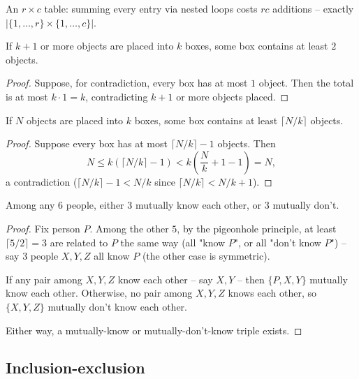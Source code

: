 \documentclass[11pt]{article}
\begin{document}
\begin{example}
An $r\times c$ table: summing every entry via nested loops costs $rc$ additions -- exactly $|\{1,\dots,r\}\times\{1,\dots,c\}|$.
\end{example}

\bigskip
\begin{definition}
If $k+1$ or more objects are placed into $k$ boxes, some box contains at least $2$ objects.
\end{definition}
\begin{proof}
Suppose, for contradiction, every box has at most $1$ object. Then the total is at most $k\cdot1=k$, contradicting $k+1$ or more objects placed.
\end{proof}

\bigskip
\begin{theorem}
If $N$ objects are placed into $k$ boxes, some box contains at least $\lceil N/k \rceil$ objects.
\end{theorem}
\begin{proof}
Suppose every box has at most $\lceil N/k\rceil - 1$ objects. Then
\[
N \le k\left(\lceil N/k\rceil - 1\right) < k\left(\frac{N}{k}+1-1\right) = N,
\]
a contradiction ($\lceil N/k\rceil - 1 < N/k$ since $\lceil N/k\rceil < N/k+1$).
\end{proof}

\bigskip
\begin{example}
Among any $6$ people, either $3$ mutually know each other, or $3$ mutually don't.
\end{example}
\begin{proof}
Fix person $P$. Among the other $5$, by the pigeonhole principle, at least $\lceil 5/2\rceil=3$ are related to $P$ the same way (all "know $P$", or all "don't know $P$") -- say $3$ people $X,Y,Z$ all know $P$ (the other case is symmetric).

If any pair among $X,Y,Z$ know each other -- say $X,Y$ -- then $\{P,X,Y\}$ mutually know each other. Otherwise, no pair among $X,Y,Z$ knows each other, so $\{X,Y,Z\}$ mutually don't know each other.

Either way, a mutually-know or mutually-don't-know triple exists.
\end{proof}

\subsection{Inclusion-exclusion}
\label{sec:8-3}
\end{document}
